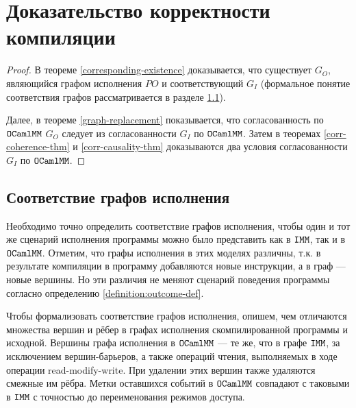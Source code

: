 \section{Доказательство корректности компиляции}
\label{proof}
\compiletheorem*
\begin{proof}
  В теореме \ref{corresponding-existence} доказывается, что существует $G_O$, являющийся графом исполнения $PO$ и соответствующий $G_I$ (формальное понятие соответствия графов рассматривается в разделе \ref{graph-correspondence}).
  
  Далее, в теореме \ref{graph-replacement} показывается, что согласованность по $\mathtt{OCaml}\allowbreak \mathtt{MM}$ $G_O$ следует из согласованности $G_I$ по $\mathtt{OCaml}\allowbreak \mathtt{MM}$. Затем в теоремах \ref{corr-coherence-thm} и \ref{corr-causality-thm} доказываются два условия согласованности $G_I$ по $\mathtt{OCaml}\allowbreak \mathtt{MM}$. 
\end{proof}



\subsection{Соответствие графов исполнения}
\label{graph-correspondence}

Необходимо точно определить соответствие графов исполнения, чтобы один и тот же сценарий исполнения программы можно было представить как в $\mathtt{IMM}$, так и в $\mathtt{OCaml}\allowbreak \mathtt{MM}$. Отметим, что графы исполнения в этих моделях различны, т.к. в результате компиляции в программу добавляются новые инструкции, а в граф --- новые вершины. Но эти различия не меняют сценарий поведения программы согласно определению \ref{definition:outcome-def}. 

Чтобы формализовать соответствие графов исполнения, опишем, чем отличаются множества вершин и рёбер в графах исполнения скомпилированной программы и исходной. Вершины графа исполнения в $\mathtt{OCaml}\allowbreak \mathtt{MM}$ --- те же, что в графе $\mathtt{IMM}$, за исключением вершин-барьеров, а также операций чтения, выполняемых в ходе операции read-modify-write. При удалении этих вершин также удаляются смежные им рёбра. Метки оставшихся событий в $\mathtt{OCaml}\allowbreak \mathtt{MM}$ совпадают с таковыми в $\mathtt{IMM}$ с точностью до переименования режимов доступа. 

